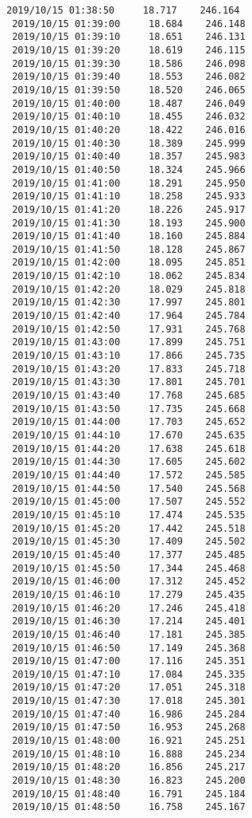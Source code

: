 \documentclass[11pt]{article}
\begin{document}
\begin{Verbatim}[commandchars=\\\{\}]
 2019/10/15 01:38:50     18.717    246.164
 2019/10/15 01:39:00     18.684    246.148
 2019/10/15 01:39:10     18.651    246.131
 2019/10/15 01:39:20     18.619    246.115
 2019/10/15 01:39:30     18.586    246.098
 2019/10/15 01:39:40     18.553    246.082
 2019/10/15 01:39:50     18.520    246.065
 2019/10/15 01:40:00     18.487    246.049
 2019/10/15 01:40:10     18.455    246.032
 2019/10/15 01:40:20     18.422    246.016
 2019/10/15 01:40:30     18.389    245.999
 2019/10/15 01:40:40     18.357    245.983
 2019/10/15 01:40:50     18.324    245.966
 2019/10/15 01:41:00     18.291    245.950
 2019/10/15 01:41:10     18.258    245.933
 2019/10/15 01:41:20     18.226    245.917
 2019/10/15 01:41:30     18.193    245.900
 2019/10/15 01:41:40     18.160    245.884
 2019/10/15 01:41:50     18.128    245.867
 2019/10/15 01:42:00     18.095    245.851
 2019/10/15 01:42:10     18.062    245.834
 2019/10/15 01:42:20     18.029    245.818
 2019/10/15 01:42:30     17.997    245.801
 2019/10/15 01:42:40     17.964    245.784
 2019/10/15 01:42:50     17.931    245.768
 2019/10/15 01:43:00     17.899    245.751
 2019/10/15 01:43:10     17.866    245.735
 2019/10/15 01:43:20     17.833    245.718
 2019/10/15 01:43:30     17.801    245.701
 2019/10/15 01:43:40     17.768    245.685
 2019/10/15 01:43:50     17.735    245.668
 2019/10/15 01:44:00     17.703    245.652
 2019/10/15 01:44:10     17.670    245.635
 2019/10/15 01:44:20     17.638    245.618
 2019/10/15 01:44:30     17.605    245.602
 2019/10/15 01:44:40     17.572    245.585
 2019/10/15 01:44:50     17.540    245.568
 2019/10/15 01:45:00     17.507    245.552
 2019/10/15 01:45:10     17.474    245.535
 2019/10/15 01:45:20     17.442    245.518
 2019/10/15 01:45:30     17.409    245.502
 2019/10/15 01:45:40     17.377    245.485
 2019/10/15 01:45:50     17.344    245.468
 2019/10/15 01:46:00     17.312    245.452
 2019/10/15 01:46:10     17.279    245.435
 2019/10/15 01:46:20     17.246    245.418
 2019/10/15 01:46:30     17.214    245.401
 2019/10/15 01:46:40     17.181    245.385
 2019/10/15 01:46:50     17.149    245.368
 2019/10/15 01:47:00     17.116    245.351
 2019/10/15 01:47:10     17.084    245.335
 2019/10/15 01:47:20     17.051    245.318
 2019/10/15 01:47:30     17.018    245.301
 2019/10/15 01:47:40     16.986    245.284
 2019/10/15 01:47:50     16.953    245.268
 2019/10/15 01:48:00     16.921    245.251
 2019/10/15 01:48:10     16.888    245.234
 2019/10/15 01:48:20     16.856    245.217
 2019/10/15 01:48:30     16.823    245.200
 2019/10/15 01:48:40     16.791    245.184
 2019/10/15 01:48:50     16.758    245.167

\end{Verbatim}
\end{document}
